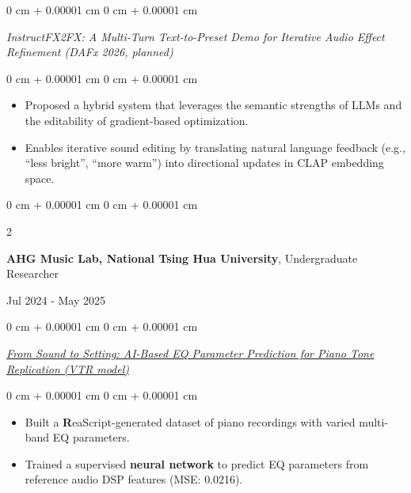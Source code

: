 \documentclass[10pt, letterpaper]{article}
\newenvironment{highlights}{
    \begin{itemize}[
        topsep=0.10 cm,
        parsep=0.10 cm,
        partopsep=0pt,
        itemsep=0pt,
        leftmargin=0 cm + 10pt
    ]
}{
    \end{itemize}
} %
\newenvironment{onecolentry}{
    \begin{adjustwidth}{
        0 cm + 0.00001 cm
    }{
        0 cm + 0.00001 cm
    }
}{
    \end{adjustwidth}
} %
\newenvironment{twocolentry}[2][]{
    \onecolentry
    \def\secondColumn{#2}
    \setcolumnwidth{\fill, 5.2 cm}
    \begin{paracol}{2}
}{
    \switchcolumn \raggedleft \secondColumn
    \end{paracol}
    \endonecolentry
} %
\begin{document}
\vspace{0.15 cm}
\begin{onecolentry}
\textit{InstructFX2FX: A Multi-Turn Text-to-Preset Demo for Iterative Audio Effect Refinement (DAFx 2026, planned)}
\end{onecolentry}
\vspace{0.10 cm}
\begin{onecolentry}
    \begin{highlights}
       \item Proposed a hybrid system that leverages the semantic strengths of LLMs and the editability of gradient-based optimization.
        \item Enables iterative sound editing by translating natural language feedback (e.g., ``less bright'', ``more warm'') into directional updates in CLAP embedding space.
    \end{highlights}
\end{onecolentry}

\vspace{0.20 cm}

\begin{twocolentry}{
    Jul 2024 - May 2025
}
    \textbf{AHG Music Lab, National Tsing Hua University}, Undergraduate Researcher
\end{twocolentry}
\vspace{0.10 cm}
\begin{onecolentry}
\textit{\href{https://arxiv.org/abs/2509.24404}{From Sound to Setting: AI-Based EQ Parameter Prediction for Piano Tone Replication (VTR model)}}
\end{onecolentry}
\vspace{0.10 cm}
\begin{onecolentry}
    \begin{highlights}
        \item Built a \textbf ReaScript-generated dataset of piano recordings with varied multi-band EQ parameters.
        \item Trained a supervised \textbf{neural network} to predict EQ parameters from reference audio DSP features (MSE: 0.0216).

    \end{highlights}
\end{onecolentry}
\end{document}
